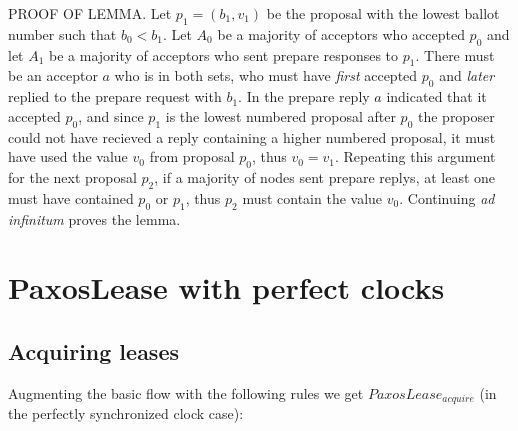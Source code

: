 \documentclass[12pt]{article}
\begin{document}
PROOF OF LEMMA. Let $p_1 = (b_1, v_1)$ be the proposal with the lowest ballot number such that $b_0 < b_1$. Let $A_0$ be a majority of acceptors who accepted $p_0$ and let $A_1$ be a majority of acceptors who sent prepare responses to $p_1$. There must be an acceptor $a$ who is in both sets, who must have \emph{first} accepted $p_0$ and \emph{later} replied to the prepare request with $b_1$. In the prepare reply $a$ indicated that it accepted $p_0$, and since $p_1$ is the lowest numbered proposal after $p_0$ the proposer could not have recieved a reply containing a higher numbered proposal, it must have used the value $v_0$ from proposal $p_0$, thus $v_0 = v_1$. Repeating this argument for the next proposal $p_2$, if a majority of nodes sent prepare replys, at least one must have contained $p_0$ or $p_1$, thus $p_2$ must contain the value $v_0$. Continuing \emph{ad infinitum} proves the lemma.

\section{ PaxosLease with perfect clocks}

\subsection{ Acquiring leases }

Augmenting the basic flow with the following rules we get $PaxosLease_{acquire}$ (in the perfectly synchronized clock case):
\end{document}
